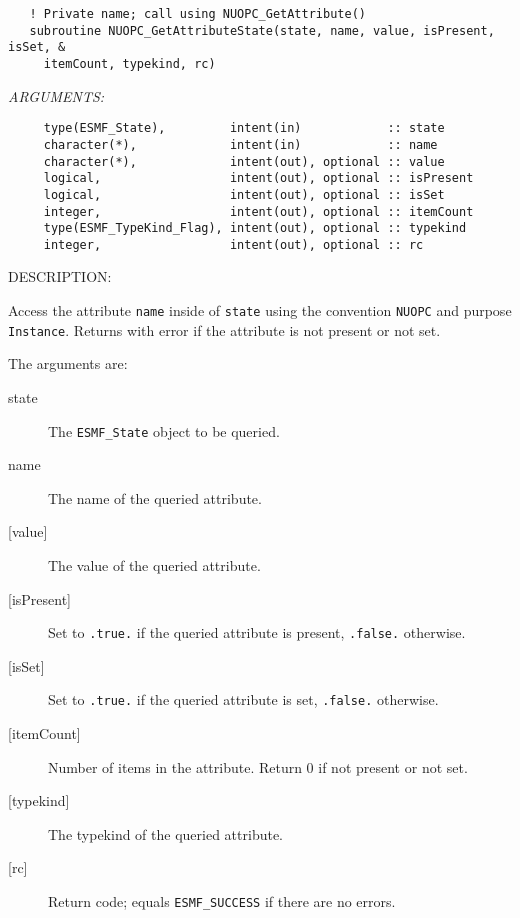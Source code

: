 \begin{verbatim}   ! Private name; call using NUOPC_GetAttribute()
   subroutine NUOPC_GetAttributeState(state, name, value, isPresent, isSet, &
     itemCount, typekind, rc)\end{verbatim}{\em ARGUMENTS:}
\begin{verbatim}     type(ESMF_State),         intent(in)            :: state
     character(*),             intent(in)            :: name
     character(*),             intent(out), optional :: value
     logical,                  intent(out), optional :: isPresent
     logical,                  intent(out), optional :: isSet
     integer,                  intent(out), optional :: itemCount
     type(ESMF_TypeKind_Flag), intent(out), optional :: typekind
     integer,                  intent(out), optional :: rc\end{verbatim}
{\sf DESCRIPTION:\\ }


     Access the attribute {\tt name} inside of {\tt state} using the
     convention {\tt NUOPC} and purpose {\tt Instance}. Returns with error if
     the attribute is not present or not set.
  
     The arguments are:
     \begin{description}
     \item[state]
       The {\tt ESMF\_State} object to be queried.
     \item[name]
       The name of the queried attribute.
     \item[{[value]}]
       The value of the queried attribute.
     \item[{[isPresent]}]
       Set to {\tt .true.} if the queried attribute is present, {\tt .false.}
       otherwise.
     \item[{[isSet]}]
       Set to {\tt .true.} if the queried attribute is set, {\tt .false.}
       otherwise.
     \item[{[itemCount]}]
       Number of items in the attribute. Return 0 if not present or not set.
     \item[{[typekind]}]
       The typekind of the queried attribute.
     \item[{[rc]}]
       Return code; equals {\tt ESMF\_SUCCESS} if there are no errors.
     \end{description}
   
 
\mbox{}\hrulefill\ 
 
